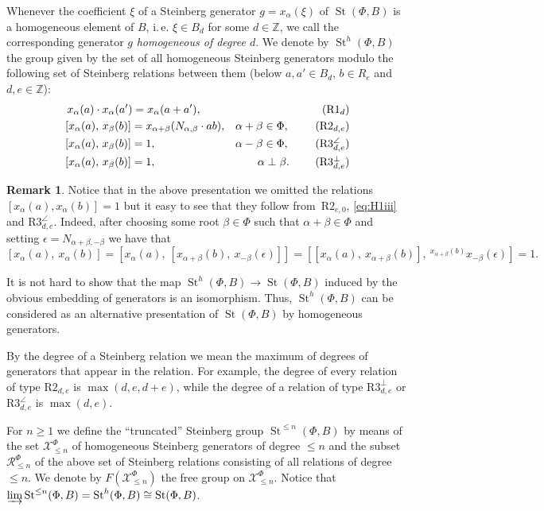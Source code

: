 \documentclass[oneside, 8pt]{amsart}
\theoremstyle{remark}
\theoremstyle{definition}
\numberwithin{lemma}{section}
\numberwithin{prop}{section}
\numberwithin{corollary}{section}
\numberwithin{externaltheorem}{section}
\newtheorem{rem}[lemma]{Remark}
\DeclareMathOperator{\St}{St}
\numberwithin{equation}{section}
\begin{document}
Whenever the coefficient $\xi$ of a Steinberg generator $g = x_\alpha(\xi)$ of $\St(\Phi, B)$ is a homogeneous element of $B$, i.\,e. $\xi \in B_d$ for some $d \in \mathbb{Z}$,
 we call the corresponding generator $g$ {\it homogeneous of degree $d$}.
We denote by $\St^h(\Phi, B)$ the group given by the set of all homogeneous Steinberg generators modulo the following set of Steinberg relations between them
(below $a, a' \in B_d$, $b\in R_e$ and $d,e \in \mathbb{Z}$): 
\begin{align}
&\,\,x_{\alpha}(a)\cdot x_{\alpha}(a') =  x_{\alpha}(a+a'),                        & \tag{R$1_d$} \\
&\,[x_{\alpha}(a),\,x_{\beta}(b)]= x_{\alpha+\beta}(N_{\alpha, \beta} \cdot ab),   & \alpha + \beta \in \Phi,\ \tag{R$2_{d,e}$} \\
&\,[x_{\alpha}(a),\,x_{\beta}(b)]= 1,                                              & \alpha - \beta \in \Phi,\ \tag{R$3^\angle_{d,e}$} \\
&\,[x_{\alpha}(a),\,x_{\beta}(b)]= 1,                                              & \alpha \perp \beta.\ \tag{R$3^\bot_{d,e}$}
\end{align}
\begin{rem}
Notice that in the above presentation we omitted the relations $[x_\alpha(a), x_\alpha(b)] = 1$ but it easy to see that they follow from~$\text{R2}_{e,0}$, \eqref{eq:H1iii} and $\text{R3}_{d,e}^\angle$. Indeed, after choosing some root $\beta\in \Phi$ such that $\alpha+\beta\in\Phi$ and setting $\epsilon = N_{\alpha+\beta,-\beta}$ we have that \[ [x_\alpha(a),\ x_\alpha(b)] = [x_\alpha(a),\ [x_{\alpha+\beta}(b),\ x_{-\beta}(\epsilon)]] = [[x_\alpha(a),\ x_{\alpha+\beta}(b)],\ {}^{x_{\alpha+\beta}(b)}\!x_{-\beta}(\epsilon)] = 1. \]
\end{rem}

It is not hard to show that the map $\St^h(\Phi, B) \to \St(\Phi, B)$ induced by the obvious embedding of generators is an isomorphism. Thus, $\St^h(\Phi, B)$ can be considered as an alternative presentation of $\St(\Phi, B)$ by homogeneous generators.

By the degree of a Steinberg relation we mean the maximum of degrees of generators that appear in the relation.
For example, the degree of every relation of type $\text{R2}_{d,e}$ is $\max(d,e,d+e)$, while the degree of a relation of type $\text{R3}^\bot_{d,e}$ or $\text{R3}^\angle_{d,e}$ is $\max(d,e)$.

For $n\geq 1$ we define the ``truncated'' Steinberg group $\St^{\leq n}(\Phi, B)$ by means of the set $\mathcal{X}_{\leq n}^\Phi$ of homogeneous Steinberg generators of degree $\leq n$ and the subset $\mathcal{R}_{\leq n}^\Phi$ of the above set of Steinberg relations consisting of all relations of degree $\leq n$.  We denote by $F(\mathcal{X}^\Phi_{\leq n})$ the free group on $\mathcal{X}^\Phi_{\leq n}$. Notice that $\varinjlim\limits \St^{\leq n}(\Phi, B) = \St^h(\Phi, B) \cong \St(\Phi, B)$.
\end{document}
